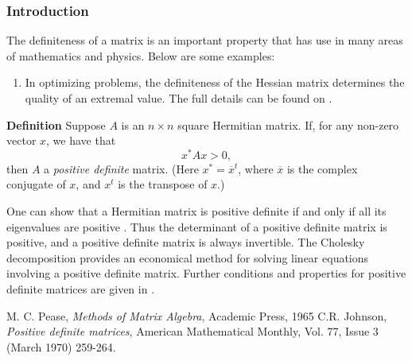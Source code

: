 \documentclass[12pt]{article}
\begin{document}
\subsubsection*{Introduction}
The definiteness of a matrix is an important
property that has use in many areas of mathematics and  physics. 
Below are some examples:

\begin{enumerate}
\item In optimizing problems, the definiteness of the 
Hessian matrix determines the quality of an extremal value. 
The full details can be found on 
.
\end{enumerate}


{\bf Definition} \cite{pease}
Suppose $A$ is an $n\times n$ square Hermitian matrix. 
If, for any non-zero vector $x$, we have that
 $$x^\ast Ax>0,$$
then $A$ a \emph{positive definite} matrix. (Here $x^\ast=\overline{x}^t$,
where $\overline{x}$ is the complex conjugate of $x$, and $x^t$ is
the transpose of $x$.)

One can show that  a Hermitian matrix is positive definite if 
and only if all its eigenvalues are positive \cite{pease}. 
Thus the determinant of a positive definite matrix
is positive, and 
 a positive definite matrix is always invertible.
The Cholesky decomposition provides an economical method for
solving linear equations involving a positive definite matrix. 
Further conditions and properties for positive definite matrices
are given in \cite{johnson:pdm}.
 
\begin{thebibliography}{9}
 M. C. Pease,
 \emph{Methods of Matrix Algebra},
 Academic Press, 1965
 C.R. Johnson, \emph{Positive definite matrices},
  American Mathematical Monthly, Vol. 77, Issue 3 (March 1970) 259-264.
\end{thebibliography}
\end{document}
